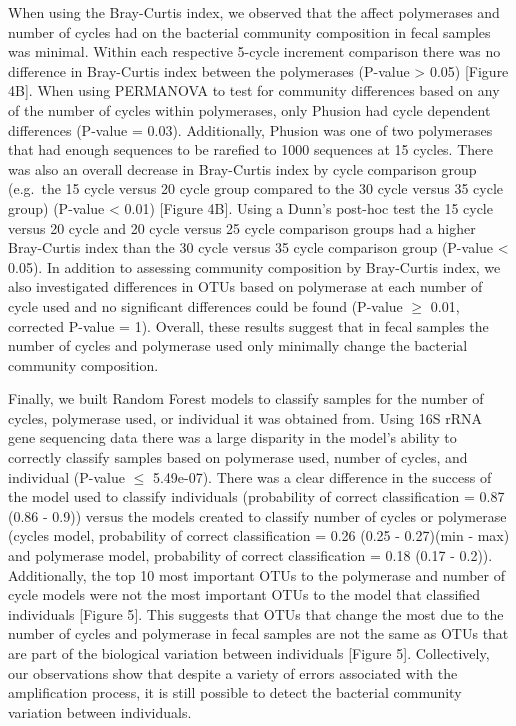 \documentclass[11pt,]{article}
\begin{document}
When using the Bray-Curtis index, we observed that the affect
polymerases and number of cycles had on the bacterial community
composition in fecal samples was minimal. Within each respective 5-cycle
increment comparison there was no difference in Bray-Curtis index
between the polymerases (P-value \textgreater{} 0.05) {[}Figure 4B{]}.
When using PERMANOVA to test for community differences based on any of
the number of cycles within polymerases, only Phusion had cycle
dependent differences (P-value = 0.03). Additionally, Phusion was one of
two polymerases that had enough sequences to be rarefied to 1000
sequences at 15 cycles. There was also an overall decrease in
Bray-Curtis index by cycle comparison group (e.g.~the 15 cycle versus 20
cycle group compared to the 30 cycle versus 35 cycle group) (P-value
\textless{} 0.01) {[}Figure 4B{]}. Using a Dunn's post-hoc test the 15
cycle versus 20 cycle and 20 cycle versus 25 cycle comparison groups had
a higher Bray-Curtis index than the 30 cycle versus 35 cycle comparison
group (P-value \textless{} 0.05). In addition to assessing community
composition by Bray-Curtis index, we also investigated differences in
OTUs based on polymerase at each number of cycle used and no significant
differences could be found (P-value \(\geqslant\) 0.01, corrected
P-value = 1). Overall, these results suggest that in fecal samples the
number of cycles and polymerase used only minimally change the bacterial
community composition.

Finally, we built Random Forest models to classify samples for the
number of cycles, polymerase used, or individual it was obtained from.
Using 16S rRNA gene sequencing data there was a large disparity in the
model's ability to correctly classify samples based on polymerase used,
number of cycles, and individual (P-value \(\leqslant\) 5.49e-07). There
was a clear difference in the success of the model used to classify
individuals (probability of correct classification = 0.87 (0.86 - 0.9))
versus the models created to classify number of cycles or polymerase
(cycles model, probability of correct classification = 0.26 (0.25 -
0.27)(min - max) and polymerase model, probability of correct
classification = 0.18 (0.17 - 0.2)). Additionally, the top 10 most
important OTUs to the polymerase and number of cycle models were not the
most important OTUs to the model that classified individuals {[}Figure
5{]}. This suggests that OTUs that change the most due to the number of
cycles and polymerase in fecal samples are not the same as OTUs that are
part of the biological variation between individuals {[}Figure 5{]}.
Collectively, our observations show that despite a variety of errors
associated with the amplification process, it is still possible to
detect the bacterial community variation between individuals.
\end{document}
